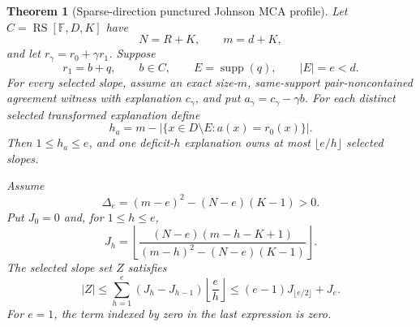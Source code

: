 \documentclass[11pt,a4paper]{amsart}
\numberwithin{equation}{section}
\newtheorem{theorem}{Theorem}[section]
\theoremstyle{remark}
\DeclareMathOperator{\RS}{RS}\DeclareMathOperator{\MCA}{MCA}\DeclareMathOperator{\CA}{CA}
\newcommand{\F}{\mathbb F}\newcommand{\B}{\mathbb B}\newcommand{\K}{\mathbb K}\newcommand{\Z}{\mathbb Z}
\begin{document}
\begin{theorem}[Sparse-direction punctured Johnson MCA profile]
\label{thm:sparse-direction-punctured-johnson-mca}
Let \(C=\RS[\F,D,K]\) have
\[
  N=R+K,\qquad m=d+K,
\]
and let \(r_\gamma=r_0+\gamma r_1\).  Suppose
\[
  r_1=b+q,\qquad b\in C,\qquad
  E=\operatorname{supp}(q),\qquad |E|=e<d.
\]
For every selected slope, assume an exact size-\(m\), same-support
pair-noncontained agreement witness with explanation \(c_\gamma\), and put
\(a_\gamma=c_\gamma-\gamma b\).  For each distinct selected transformed
explanation define
\[
 h_a=m-|\{x\in D\setminus E:a(x)=r_0(x)\}|.
\]
Then \(1\le h_a\le e\), and one deficit-\(h\) explanation owns at most
\(\lfloor e/h\rfloor\) selected slopes.

Assume
\begin{equation}
  \Delta_e=(m-e)^2-(N-e)(K-1)>0.
  \label{eq:punctured-johnson-positive}
\end{equation}
Put \(J_0=0\) and, for \(1\le h\le e\),
\begin{equation}
 J_h=\left\lfloor
 \frac{(N-e)(m-h-K+1)}{(m-h)^2-(N-e)(K-1)}
 \right\rfloor .
 \label{eq:punctured-johnson-cap}
\end{equation}
The selected slope set \(Z\) satisfies
\begin{equation}
 |Z|\le \sum_{h=1}^e(J_h-J_{h-1})\left\lfloor\frac eh\right\rfloor
 \le (e-1)J_{\lfloor e/2\rfloor}+J_e.
 \label{eq:punctured-johnson-profile}
\end{equation}
For \(e=1\), the term indexed by zero in the last expression is zero.
\end{theorem}
\end{document}
